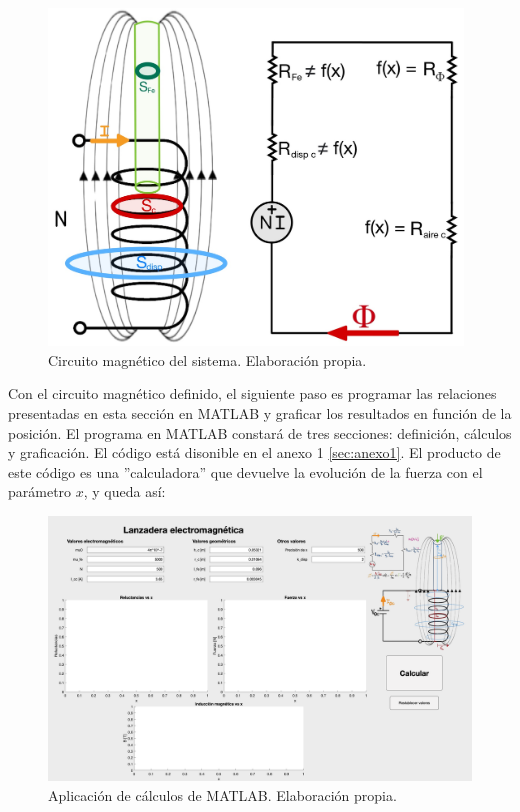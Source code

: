 \begin{figure}[H]
    \centering
    \includegraphics[width=11cm]{FigurasMemoria/circuitoMag.jpg}
    \caption{Circuito magnético del sistema. Elaboración propia.}
    \label{fig:circuitoMag} %
\end{figure}

\newpage

Con el circuito magnético definido, el siguiente paso es programar las relaciones presentadas en esta sección en MATLAB y graficar los resultados en función de la posición. El programa en MATLAB constará de tres secciones: definición, cálculos y graficación. El código está disonible en el anexo 1 \ref{sec:anexo1}. El producto de este código es una ''calculadora'' que devuelve la evolución de la fuerza con el parámetro \(x\), y queda así:

\begin{figure}[H]
    \centering
    \includegraphics[width=13cm]{FigurasMemoria/calculadora.png}
    \caption{Aplicación de cálculos de MATLAB. Elaboración propia.}
    \label{fig:calculadora} %
\end{figure}


